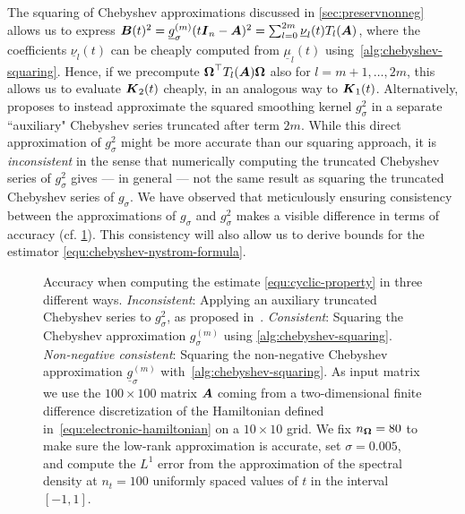The squaring of Chebyshev approximations discussed in \cref{sec:preservnonneg} allows us to express $\boldsymbol{B}(t)^2 = \underline{g}_{\sigma}^{(m)}(t \boldsymbol{I}_n - \boldsymbol{A})^2 = \sum_{l=0}^{2m} \underline{\nu}_l(t) T_l(\boldsymbol{A})$, where the coefficients $\underline{\nu}_l(t)$ can be cheaply computed from $\underline{\mu}_l(t)$ using~\cref{alg:chebyshev-squaring}. Hence, if we precompute
$\boldsymbol{\Omega}^{\top} T_l(\boldsymbol{A}) \boldsymbol{\Omega}$
also for $l=m+1, \dots, 2m$, this allows us to evaluate $\boldsymbol{K}_2(t)$ cheaply, in an analogous way to $\boldsymbol{K}_1(t)$. Alternatively, \cite{lin-2017-randomized-estimation} proposes to instead approximate the squared smoothing kernel $g_{\sigma}^2$ in a separate ``auxiliary" Chebyshev series truncated after term $2m$. While this direct approximation of $g_{\sigma}^2$ might be more accurate than our squaring approach, it is \emph{inconsistent} in the sense that numerically computing the truncated Chebyshev series of $g_{\sigma}^2$ gives --- in general --- not the same result as squaring the truncated Chebyshev series of $g_{\sigma}$. We have observed that meticulously ensuring consistency between the approximations of $g_{\sigma}$ and $g_{\sigma}^2$ makes a visible difference in terms of accuracy (cf. \cref{fig:interpolation-issue}). This consistency will also allow us to derive bounds for the estimator \cref{equ:chebyshev-nystrom-formula}.

\begin{figure}[ht]
    \centering
    \scalebox{0.8}{}
    \caption{Accuracy when computing the estimate \cref{equ:cyclic-property} in three different ways. \emph{Inconsistent}: Applying an auxiliary truncated Chebyshev series to $g_{\sigma}^2$, as proposed in~\cite{lin-2017-randomized-estimation}. \emph{Consistent}: Squaring the Chebyshev approximation $g_{\sigma}^{(m)}$ using \cref{alg:chebyshev-squaring}. \emph{Non-negative consistent}: Squaring the non-negative Chebyshev approximation $\underline{g}_{\sigma}^{(m)}$ with~\cref{alg:chebyshev-squaring}. As input matrix we use the $100 \times 100$ matrix $\boldsymbol{A}$ coming from a two-dimensional finite difference discretization of the Hamiltonian defined in~\cref{equ:electronic-hamiltonian} on a $10 \times 10$ grid. We fix $n_{\boldsymbol{\Omega}} = 80$ to make sure the low-rank approximation is accurate, set $\sigma = 0.005$, and compute the $L^1$ error from the approximation of the spectral density at $n_t = 100$ uniformly spaced values of $t$ in the interval $[-1, 1]$.}
    \label{fig:interpolation-issue}
\end{figure}

